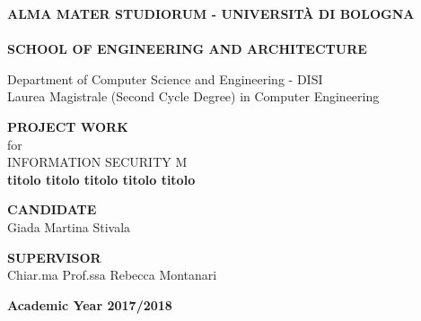 \thispagestyle{empty}
\begin{titlepage}

\vspace*{-1.5cm}
\begin{center}
  \large
  \textbf{ALMA MATER STUDIORUM - UNIVERSIT\`A DI BOLOGNA}\\
  
  \hrulefill\\
  
  \textbf{SCHOOL OF ENGINEERING AND ARCHITECTURE}\\
  \vspace*{.75cm}
  
  
  Department of Computer Science and Engineering - DISI\\
  Laurea Magistrale (Second Cycle Degree) in Computer Engineering\\
  
  \vspace*{1.2cm}
  
  
  \textbf{PROJECT WORK}\\
  \vspace*{.4cm}
  for\\
  \vspace*{.4cm}
  INFORMATION SECURITY M\\

  \vspace*{2cm} \LARGE
  \textbf{titolo titolo titolo titolo titolo}\\
 \end{center}
 
 \vspace*{3cm}
 
 \begin{flushleft}
  \textbf{CANDIDATE}\\ Giada Martina Stivala \\
\end{flushleft}

\vspace*{-2cm}

 \begin{flushright}
  \textbf{SUPERVISOR}\\ Chiar.ma Prof.ssa Rebecca Montanari \\
 \end{flushright}


\vspace*{2cm}

\begin{center}
	\textbf{
  Academic Year 2017/2018\\
  }
\end{center} 
\clearpage
\end{titlepage}